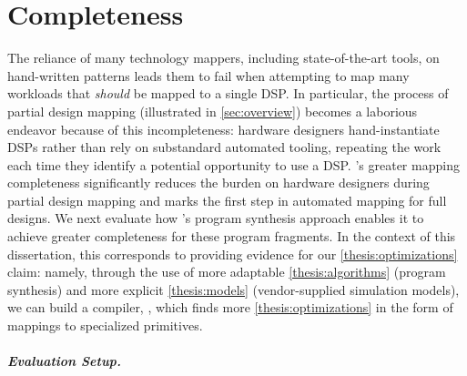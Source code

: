 \section{\lr Completeness}
\label{sec:completeness}
% 
% 
The reliance of many technology mappers,
  including state-of-the-art tools,
  on hand-written patterns
  leads them to fail when attempting to map many workloads
  that \textit{should} be mapped to a single DSP.
In particular, 
  the process of partial
  design mapping 
  (illustrated in \cref{sec:overview}) 
  becomes
  a laborious endeavor because
  of this incompleteness:
  hardware designers
  hand-instantiate DSPs rather
  than rely on substandard
  automated tooling, repeating
  the work each time they identify a potential
  opportunity to use a DSP.
\lr's greater mapping completeness 
  significantly
  reduces the burden on hardware
  designers during partial
  design mapping and marks 
  the first step in automated
  mapping for full designs.
  We next evaluate how \lr's program synthesis approach
  enables it to achieve greater completeness
  for these program fragments.
In the context of this dissertation,
  this corresponds to providing evidence
  for our \cref{thesis:optimizations} claim:
  namely,
  through the use of
   more adaptable \cref{thesis:algorithms}
  (program synthesis)
  and more explicit \cref{thesis:models}
  (vendor-supplied simulation models),
  we can build a compiler,
  \lr,
  which finds more \cref{thesis:optimizations}
  in the form of mappings to
  specialized primitives.
  
  
\paragraph{\textnormal{\textit{\textbf{Evaluation Setup.}}}}

